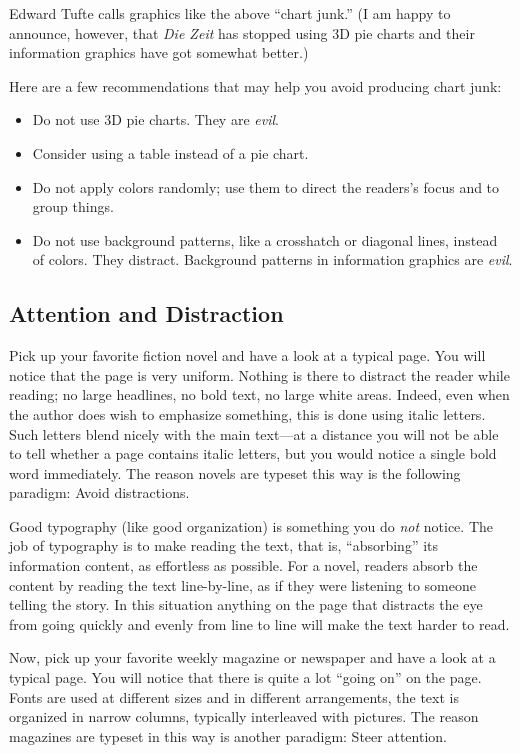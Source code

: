 %
Edward Tufte calls graphics like the above ``chart junk.'' (I am happy to
announce, however, that \emph{Die Zeit} has stopped using 3D pie charts and
their information graphics have got somewhat better.)

Here are a few recommendations that may help you avoid producing chart junk:
%
\begin{itemize}
    \item Do not use 3D pie charts. They are \emph{evil}.
    \item Consider using a table instead of a pie chart.
    \item Do not apply colors randomly; use them to direct the readers's
        focus and to group things.
    \item Do not use background patterns, like a crosshatch or diagonal
        lines, instead of colors. They distract. Background patterns in
        information graphics are \emph{evil}.
\end{itemize}


\subsection{Attention and Distraction}

Pick up your favorite fiction novel and have a look at a typical page. You will
notice that the page is very uniform. Nothing is there to distract the reader
while reading; no large headlines, no bold text, no large white areas. Indeed,
even when the author does wish to emphasize something, this is done using
italic letters. Such letters blend nicely with the main text---at a distance
you will not be able to tell whether a page contains italic letters, but you
would notice a single bold word immediately. The reason novels are typeset this
way is the following paradigm: Avoid distractions.

Good typography (like good organization) is something you do \emph{not} notice.
The job of typography is to make reading the text, that is, ``absorbing'' its
information content, as effortless as possible. For a novel, readers absorb the
content by reading the text line-by-line, as if they were listening to someone
telling the story. In this situation anything on the page that distracts the
eye from  going quickly and evenly from line to line will make the text harder
to read.

Now, pick up your favorite weekly magazine or newspaper and have a look at a
typical page. You will notice that there is quite a lot ``going on'' on the
page. Fonts are used at different sizes and in different arrangements, the text
is organized in narrow columns, typically interleaved with pictures. The reason
magazines are typeset in this way is another paradigm: Steer attention.

